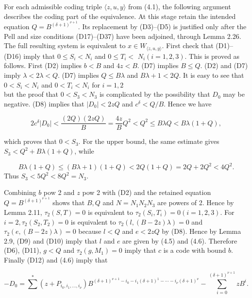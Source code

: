 \documentclass[11pt,a4paper]{article}
\newcommand{\origpage}[1]{\marginnote{\footnotesize\textbf{[#1]}}}
\begin{document}
For each admissible coding triple $\langle z,\allowbreak u,\allowbreak y\rangle$ from (4.1), the following argument describes the coding part of the equivalence. At this stage retain the intended equation $Q=B^{(\delta+1)^{\nu+1}}$. Its replacement by (D3)--(D5) is justified only after the Pell and size conditions (D17)--(D37) have been adjoined, through Lemma 2.26. The full resulting system is equivalent to $x\in W_{\langle z,u,y\rangle}$. First check that (D1)--(D16) imply that $0 \leq S_{i}<N_{i}$ and $0 \leq T_{i}<$ $N_{i}(i=1,\allowbreak 2,\allowbreak 3)$. This is proved as follows. First (D2) implies $b<B$ and $4 z<B$. (D7) implies $B \leq Q$. (D2) and (D7) imply $\lambda<2 \lambda<Q$. (D7) implies $Q \leq B \lambda$ and $B \lambda+1<2 Q$. It is easy to see that $0<S_{i}<N_{i}$ and $0<T_{i}<N_{i}$ for $i=1,\allowbreak 2$\\
\origpage{569}but the proof that $0<S_{3}<N_{3}$ is complicated by the possibility that $D_{0}$ may be negative. (D8) implies that $\left|D_{0}\right|<2 z Q$ and $c^{\delta}<Q / B$. Hence we have

\[
2 c^{\delta}\left|D_{0}\right|<\frac{(2 Q)(2 z Q)}{B}=\frac{4 z}{B} Q^{2}<Q^{2} \leq B \lambda Q<B \lambda(1+Q),
\]

which proves that $0<S_{3}$. For the upper bound, the same estimate gives $S_3<Q^2+B\lambda(1+Q)$, while

\[
B \lambda(1+Q) \leq(B \lambda+1)(1+Q)<2 Q(1+Q)=2 Q+2 Q^{2}<4 Q^{2} .
\]
Thus $S_3<5Q^2<8Q^2=N_3$.

Combining $b$ pow 2 and $z$ pow 2 with (D2) and the retained equation $Q=B^{(\delta+1)^{\nu+1}}$ shows that $B,\allowbreak Q$ and $N=N_1N_2N_3$ are powers of 2. Hence by Lemma 2.11, $\tau_{2}(S,\allowbreak  T)=0$ is equivalent to $\tau_{2}\left(S_{i},\allowbreak  T_{i}\right)=0(i=1,\allowbreak 2,\allowbreak 3)$. For $i=2,\allowbreak  \tau_{2}\left(S_{2},\allowbreak  T_{2}\right)=0$ is equivalent to $\tau_{2}(l,\allowbreak (B-2 z) \lambda)=0$ and $\tau_{2}(e,\allowbreak (B-2 z) \lambda)=0$ because $l<Q$ and $e<2 z Q$ by (D8). Hence by Lemma 2.9, (D9) and (D10) imply that $l$ and $e$ are given by (4.5) and (4.6). Therefore (D6), (D11), $g<Q$ and $\tau_{2}\left(g,\allowbreak  M_{1}\right)=0$ imply that $c$ is a code with bound $b$. Finally (D12) and (4.6) imply that

\[
-D_{0}=\sum^{*}\left(z+P_{i_{0}, i_{1}, \ldots, i_{\nu}}\right) B^{(\delta+1)^{\nu+1}-i_{0}-i_{1}(\delta+1)^{1}-\cdots-i_{\nu}(\delta+1)^{\nu}}-\sum_{i=0}^{(\delta+1)^{\nu+1}} z B^{i} .
\]
\end{document}
